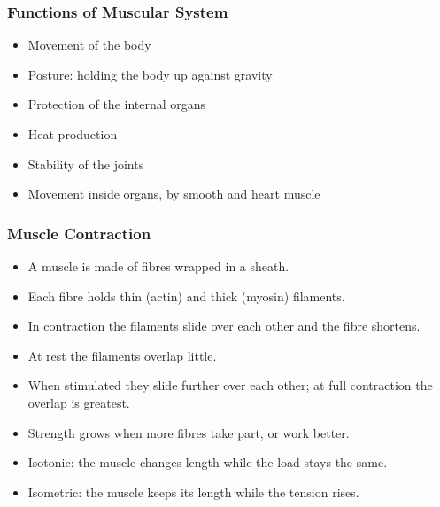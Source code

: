 \begin{frame}[fragile]\frametitle{Functions of Muscular System}

      \begin{itemize}
		\item Movement of the body
		\item Posture: holding the body up against gravity
		\item Protection of the internal organs
		\item Heat production
		\item Stability of the joints
		\item Movement inside organs, by smooth and heart muscle
	  \end{itemize}

\end{frame}

\begin{frame}[fragile]\frametitle{Muscle Contraction}

      \begin{itemize}
		\item A muscle is made of fibres wrapped in a sheath.
		\item Each fibre holds thin (actin) and thick (myosin) filaments.
		\item In contraction the filaments slide over each other and the fibre shortens.
		\item At rest the filaments overlap little.
		\item When stimulated they slide further over each other; at full contraction the overlap is greatest.
		\item Strength grows when more fibres take part, or work better.
		\item Isotonic: the muscle changes length while the load stays the same.
		\item Isometric: the muscle keeps its length while the tension rises.
	  \end{itemize}

\end{frame}

